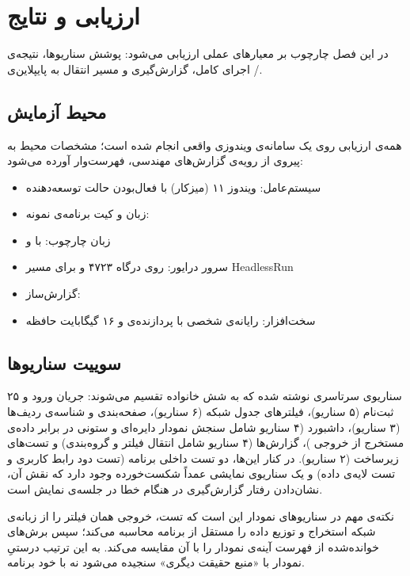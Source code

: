 \chapter{ارزیابی و نتایج}
\label{chap:evaluation}

در این فصل چارچوب بر معیارهای عملی ارزیابی می‌شود: پوشش سناریوها، نتیجه‌ی اجرای کامل، گزارش‌گیری و مسیر انتقال به پایپلاین‌ی
/.

\section{محیط آزمایش}
همه‌ی ارزیابی روی یک سامانه‌ی ویندوزی واقعی انجام شده است؛ مشخصات محیط به پیروی از رویه‌ی گزارش‌های مهندسی، فهرست‌وار آورده می‌شود:
\begin{itemize}
	\item سیستم‌عامل: ویندوز ۱۱ (میزکار) با فعال‌بودن حالت توسعه‌دهنده
	\item زبان و کیت برنامه‌ی نمونه:
	\item زبان چارچوب:
	با
	و
	\item سرور درایور:
	روی درگاه ۴۷۲۳ و
	برای مسیر \gls{HeadlessRun}
	\item گزارش‌ساز:
	\item سخت‌افزار: رایانه‌ی شخصی با پردازنده‌ی
	و ۱۶ گیگابایت حافظه
\end{itemize}

\section{سوییت سناریوها}
۲۵ سناریوی سرتاسری نوشته شده که به شش خانواده تقسیم می‌شوند: جریان ورود و ثبت‌نام (۵ سناریو)، فیلترهای جدول شبکه (۶ سناریو)، صفحه‌بندی و شناسه‌ی ردیف‌ها (۳ سناریو)، داشبورد (۴ سناریو شامل سنجش نمودار دایره‌ای و ستونی در برابر داده‌ی مستخرج از خروجی
)،
گزارش‌ها (۴ سناریو شامل انتقال فیلتر و گروه‌بندی) و تست‌های زیرساخت (۲ سناریو). در کنار این‌ها، دو تست داخلی برنامه (تست دود رابط کاربری و تست لایه‌ی داده) و یک سناریوی نمایشی عمداً شکست‌خورده وجود دارد که نقش آن، نشان‌دادن رفتار گزارش‌گیری در هنگام خطا در جلسه‌ی نمایش است.

نکته‌ی مهم در سناریوهای نمودار این است که تست، خروجی
همان فیلتر را از زبانه‌ی شبکه استخراج و توزیع داده را مستقل از برنامه محاسبه می‌کند؛ سپس برش‌های خوانده‌شده از فهرست آینه‌ی نمودار را با آن مقایسه می‌کند. به این ترتیب درستیِ نمودار با «منبع حقیقت دیگری» سنجیده می‌شود نه با خود برنامه.

